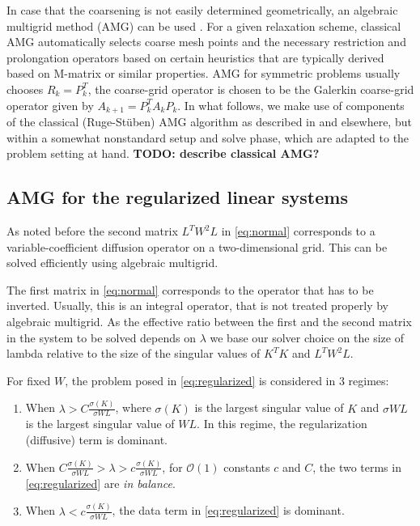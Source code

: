 In case that the coarsening is not easily determined geometrically, an
algebraic multigrid method (AMG) can be
used \cite{ABrandt_SFMcCormick_JWRuge_1984a, JWRuge_KStuben_1987a,
KStuben_2001a}. For a given relaxation scheme, classical AMG
automatically selects coarse mesh points and the necessary restriction
and prolongation operators based on certain heuristics that are
typically derived based on M-matrix or similar properties. AMG for
symmetric problems usually chooses $R_k = P_k^T$, the coarse-grid
operator is chosen to be the Galerkin coarse-grid operator given by
$A_{k+1} = P_k^T A_k P_k$.  In what follows, we make use of components
of the classical (Ruge-St\"uben) AMG algorithm as described
in \cite{JWRuge_KStuben_1987a} and elsewhere, but within a somewhat
nonstandard setup and solve phase, which are adapted to the problem
setting at hand.  {\bf TODO: describe classical AMG?}

\subsection{AMG for the regularized linear systems}

As noted before the second matrix $L^T W^2 L$ in \eqref{eq:normal}
corresponds to a variable-coefficient diffusion operator on a
two-dimensional grid. This can be solved efficiently using algebraic multigrid.

The first matrix in \eqref{eq:normal} corresponds to the operator that
has to be inverted. Usually, this is an integral operator, that is not
treated properly by algebraic multigrid. As the effective ratio
between the first and the second matrix in the system to be solved
depends on $\lambda$ we base our solver choice on the size of lambda
relative to the size of the singular values of $K^T K$ and $L^T W^2
L$.

For fixed $W$, the problem posed in \eqref{eq:regularized} is considered in 3 regimes:
\begin{enumerate}
\item When $\lambda > C \frac{\sigma(K)}{\sigma{WL}}$, where
  $\sigma(K)$ is the largest singular value of $K$ and $\sigma{WL}$ is
  the largest singular value of $WL$.  In this regime, the
  regularization (diffusive) term is dominant.
\item When $C \frac{\sigma(K)}{\sigma{WL}} > \lambda > c
  \frac{\sigma(K)}{\sigma{WL}}$, for $\mathcal{O}(1)$ constants $c$
  and $C$, the two terms in \eqref{eq:regularized} are {\it in
    balance}.
\item When $\lambda < c \frac{\sigma(K)}{\sigma{WL}}$, the data term
  in \eqref{eq:regularized} is dominant.
\end{enumerate}

